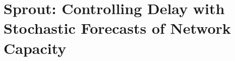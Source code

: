\chapter{Sprout: Controlling Delay with Stochastic Forecasts of Network Capacity}
\label{chap:sprout}

%




%




%
%
